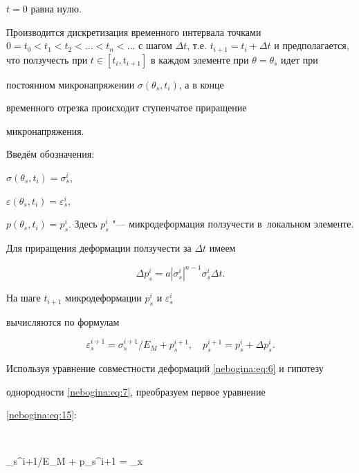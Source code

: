 ${t=0}$ равна нулю.



Производится дискретизация временного интервала точками $0=t_0

<t_1<t_2< \ldots < t_n < \ldots$ с шагом $\Delta t$, т.е. $t_{i+1}

=t_i + \Delta t$ и предполагается, что ползучесть при $t \in [t_i,

t_{i+1}]$ в каждом элементе при $\theta= \theta_s$ идет при

постоянном микронапряжении $\sigma (\theta_s, t_i)$, а в конце

временного отрезка происходит ступенчатое приращение

микронапряжения.



Введём обозначения:

$ \sigma (\theta_s, t_i)= \sigma_s^i$,

$\varepsilon(\theta_s, t_i)= \varepsilon_s^i$, 

$p(\theta_s, t_i)=p_s^i.$ Здесь $p_s^i$ "--- микродеформация ползучести в~локальном элементе. 

Для приращения деформации ползучести за $\Delta t$ имеем

\begin{equation}

\label{nebogina:eq:14} \Delta p_s^i = a |\sigma_s^i|^{n-1}

\sigma_s^i \Delta t .

\end{equation}

На шаге $t_{i+1}$ микродеформации $p_s^i$ и $\varepsilon_s^i$

вычисляются по формулам

\begin{equation} \label{nebogina:eq:15}

\varepsilon_s^{i+1} = {\sigma_s^{i+1}}/{E_M} + p_s^{i+1},\quad 

p_s^{i+1} = p_s^i + \Delta p_s^i.

\end{equation}



Используя уравнение совместности деформаций \eqref{nebogina:eq:6} и гипотезу

однородности \eqref{nebogina:eq:7}, преобразуем первое уравнение 

\eqref{nebogina:eq:15}:

$$

{\sigma_s^{i+1}}/{E_M} + p_s^{i+1} = \langle\varepsilon_x

